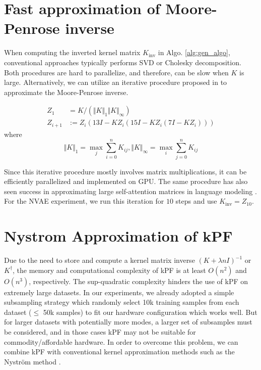 \clearpage
\section{Fast approximation of Moore-Penrose inverse}

When computing the inverted kernel matrix $K_\textrm{inv}$ in Algo. \ref{alg:gen_algo}, conventional approaches typically performs SVD or Cholesky decomposition. Both procedures are hard to parallelize, and therefore, can be slow when $K$ is large. Alternatively, we can utilize an iterative procedure proposed in \citet{Razavi2014} to approximate the Moore-Penrose inverse.

\begin{align}
    Z_{1} &= K / (\Vert K \Vert_1 \Vert K \Vert_\infty)\\
    Z_{i+1} &:= Z_i (13I - KZ_i (15I - KZ_i (7I - KZ_i ))) 
\end{align}
where 
\begin{equation}
    \Vert K \Vert_1 = \max_j \sum_{i = 0}^{n} K_{ij}, \Vert K \Vert_\infty = \max_i \sum_{j = 0}^{n} K_{ij} 
\end{equation}

Since this iterative procedure mostly involves matrix multiplications, it can be efficiently parallelized and implemented on GPU. The same procedure has also seen success in approximating large self-attention matrices in language modeling \citep{xiong2021nystromformer}. For the NVAE experiment, we run this iteration for $10$ steps and use $K_\textrm{inv} = Z_{10}$.

\clearpage
\section{Nystrom Approximation of kPF}
\label{sec:nystrom}

Due to the need to store and compute a kernel matrix inverse $(K + \lambda nI)^{-1}$ or $K^\dagger$, the memory and computational complexity of kPF is at least $O(n^2)$ and $O(n^3)$, respectively. The sup-quadratic complexity hinders the use of kPF on extremely large datasets. In our experiments, we already adopted a simple subsampling strategy which randomly select 10k training samples from each dataset ($\leq$ 50k samples) to fit our hardware configuration which works 
well. But for larger datasets with potentially more modes, a larger set of subsamples must be considered, and in those cases kPF may not be 
suitable for commodity/affordable hardware. 
In order to overcome this problem, we can combine kPF with conventional kernel approximation methods such as the Nystr\"om method \citep{williams2000nystrom}.

